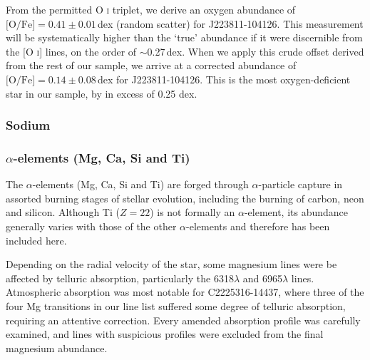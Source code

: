 \documentclass{emulateapj}
\begin{document}
From the permitted O \textsc{i} triplet, we derive an oxygen abundance of $\mbox{[O/Fe]} = 0.41 \pm 0.01$\,dex (random scatter) for J223811-104126. This measurement will be systematically higher than the `true' abundance if it were discernible from the [O \textsc{i}] lines, on the order of ${\sim}$0.27\,dex. When we apply this crude offset derived from the rest of our sample, we arrive at a corrected abundance of $\mbox{[O/Fe]} = 0.14 \pm 0.08$\,dex for J223811-104126. This is the most oxygen-deficient star in our sample, by in excess of 0.25 dex.


\subsubsection{Sodium}




\subsubsection{$\alpha$-elements (Mg, Ca, Si and Ti)}
\label{sec:alpha-elements}

The $\alpha$-elements (Mg, Ca, Si and Ti) are forged through $\alpha$-particle capture in assorted burning stages of stellar evolution, including the burning of carbon, neon and silicon. Although Ti ($Z = 22$) is not formally an $\alpha$-element, its abundance generally varies with those of the other $\alpha$-elements and therefore has been included here.

Depending on the radial velocity of the star, some magnesium lines were be affected by telluric absorption, particularly the 6318$\lambda$ and 6965$\lambda$ lines. Atmospheric absorption was most notable for C2225316-14437, where three of the four Mg transitions in our line list suffered some degree of telluric absorption, requiring an attentive correction. Every amended absorption profile was carefully examined, and lines with suspicious profiles were excluded from the final magnesium abundance.
\end{document}
